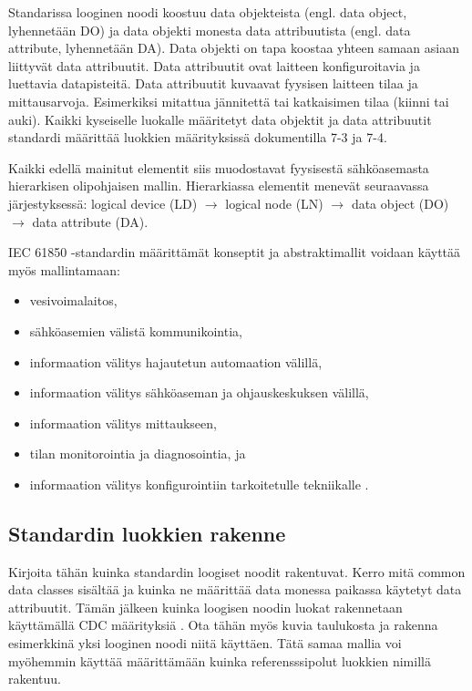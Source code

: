 Standarissa looginen noodi koostuu data objekteista (engl. data object, lyhennetään DO) ja data objekti monesta data attribuutista (engl. data attribute, lyhennetään DA). Data objekti on tapa koostaa yhteen samaan asiaan liittyvät data attribuutit. Data attribuutit ovat laitteen konfiguroitavia ja luettavia datapisteitä. Data attribuutit kuvaavat fyysisen laitteen tilaa ja mittausarvoja. Esimerkiksi mitattua jännitettä tai katkaisimen tilaa (kiinni tai auki). Kaikki kyseiselle luokalle määritetyt data objektit ja data attribuutit standardi määrittää luokkien määrityksissä dokumentilla 7-3 ja 7-4.

Kaikki edellä mainitut elementit siis muodostavat fyysisestä sähköasemasta hierarkisen olipohjaisen mallin. Hierarkiassa elementit menevät seuraavassa järjestyksessä: logical device (LD) $\rightarrow$ logical node (LN) $\rightarrow$ data object (DO) $\rightarrow$ data attribute (DA).

IEC 61850 -standardin määrittämät konseptit ja abstraktimallit voidaan käyttää myös mallintamaan:
\begin{itemize}
	\item vesivoimalaitos,
	\item sähköasemien välistä kommunikointia,
	\item informaation välitys hajautetun automaation välillä,
	\item informaation välitys sähköaseman ja ohjauskeskuksen välillä,
	\item informaation välitys mittaukseen,
	\item tilan monitorointia ja diagnosointia, ja
	\item informaation välitys konfigurointiin tarkoitetulle tekniikalle \cite[s.~11]{IEC61850-7-1}.
\end{itemize}


\subsection{Standardin luokkien rakenne}
\begin{it}
	Kirjoita tähän kuinka standardin loogiset noodit rakentuvat. Kerro mitä common data classes sisältää ja kuinka ne määrittää data monessa paikassa käytetyt data attribuutit. Tämän jälkeen kuinka loogisen noodin luokat rakennetaan käyttämällä CDC määrityksiä \cite[s.~26]{IEC61850-1}. Ota tähän myös kuvia taulukosta ja rakenna esimerkkinä yksi looginen noodi niitä käyttäen. Tätä samaa mallia voi myöhemmin käyttää määrittämään kuinka referensssipolut luokkien nimillä rakentuu.
\end{it}

